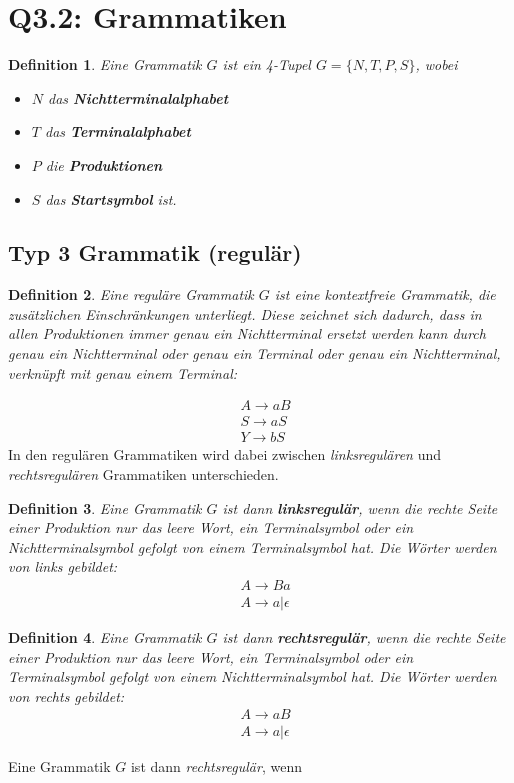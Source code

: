 \documentclass[12pt, oneside]{book}
\newtheorem{definition}{Definition}
\begin{document}
\section{Q3.2: Grammatiken}
\begin{definition}
    Eine Grammatik $G$ ist ein 4-Tupel $G=\{N,T,P,S\}$, wobei
    \begin{itemize}
        \item $N$ das \textbf{Nichtterminalalphabet}
        \item $T$ das \textbf{Terminalalphabet}
        \item $P$ die \textbf{Produktionen}
        \item $S$ das \textbf{Startsymbol} ist.
    \end{itemize}
\end{definition}
\subsection{Typ 3 Grammatik (regulär)}
\begin{definition}
    Eine reguläre Grammatik $G$ ist eine kontextfreie Grammatik, die zusätzlichen Einschränkungen unterliegt. Diese zeichnet sich dadurch, dass in allen Produktionen immer genau ein Nichtterminal ersetzt werden kann durch genau ein Nichtterminal oder genau ein Terminal oder genau ein Nichtterminal, verknüpft mit genau einem Terminal:
\end{definition}
    \begin{align*}
    &A\to aB\\
    &S\to aS\\
    &Y\to bS
\end{align*}
In den regulären Grammatiken wird dabei zwischen \textit{linksregulären} und \textit{rechtsregulären} Grammatiken unterschieden.\par
\begin{definition}
    Eine Grammatik $G$ ist dann \textbf{linksregulär}, wenn die rechte Seite einer Produktion nur das leere Wort, ein Terminalsymbol oder ein Nichtterminalsymbol gefolgt von einem Terminalsymbol hat. Die Wörter werden von links gebildet:
    \begin{align*}
        &A\to Ba\\
        &A\to a|\epsilon
    \end{align*}
\end{definition}
\begin{definition}
    Eine Grammatik $G$ ist dann \textbf{rechtsregulär}, wenn die rechte Seite einer Produktion nur das leere Wort, ein Terminalsymbol oder ein Terminalsymbol gefolgt von einem Nichtterminalsymbol hat. Die Wörter werden von rechts gebildet:
    \begin{align*}
        &A\to aB\\
        &A\to a|\epsilon
    \end{align*}
\end{definition}
Eine Grammatik $G$ ist dann \textit{rechtsregulär}, wenn
\end{document}
